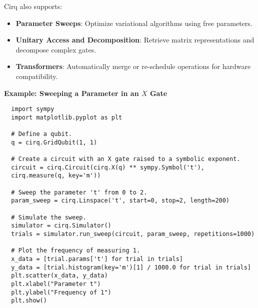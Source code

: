 Cirq also supports:

\begin{itemize}

  \item \textbf{Parameter Sweeps}: Optimize variational algorithms using free
    parameters.

  \item \textbf{Unitary Access and Decomposition}: Retrieve matrix
    representations and decompose complex gates.

  \item \textbf{Transformers}: Automatically merge or re-schedule operations
    for hardware compatibility.

\end{itemize}

\textbf{Example: Sweeping a Parameter in an \(X\) Gate}
\begin{verbatim}
  import sympy
  import matplotlib.pyplot as plt

  # Define a qubit.
  q = cirq.GridQubit(1, 1)

  # Create a circuit with an X gate raised to a symbolic exponent.
  circuit = cirq.Circuit(cirq.X(q) ** sympy.Symbol('t'),
  cirq.measure(q, key='m'))

  # Sweep the parameter 't' from 0 to 2.
  param_sweep = cirq.Linspace('t', start=0, stop=2, length=200)

  # Simulate the sweep.
  simulator = cirq.Simulator()
  trials = simulator.run_sweep(circuit, param_sweep, repetitions=1000)

  # Plot the frequency of measuring 1.
  x_data = [trial.params['t'] for trial in trials]
  y_data = [trial.histogram(key='m')[1] / 1000.0 for trial in trials]
  plt.scatter(x_data, y_data)
  plt.xlabel("Parameter t")
  plt.ylabel("Frequency of 1")
  plt.show()
\end{verbatim}

